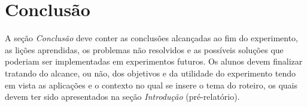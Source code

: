 \documentclass[10pt,twocolumn,letterpaper]{article}
\begin{document}
\section{Conclusão}

A seção {\em Conclusão} deve conter as conclusões alcançadas ao fim do experimento, as lições aprendidas, os problemas não resolvidos e as possíveis soluções que poderiam ser implementadas em experimentos futuros. Os alunos devem finalizar tratando do alcance, ou não, dos objetivos e da utilidade do experimento tendo em vista as aplicações e o contexto no qual se insere o tema do roteiro, os quais devem ter sido apresentados na seção {\em Introdução} (pré-relatório).

{\small


}
\end{document}
